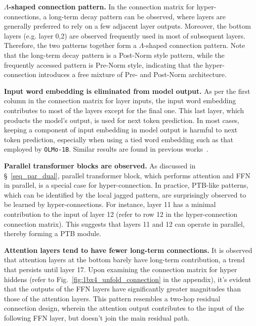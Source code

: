 \textbf{$\Lambda$-shaped connection pattern. } In the connection matrix for hyper-connections, a long-term decay pattern can be observed, where layers are generally preferred to rely on a few adjacent layer outputs. Moreover, the bottom layers (e.g. layer 0,2) are observed frequently used in most of subsequent layers. Therefore, the two patterns together form a $\Lambda$-shaped connection pattern. Note that the long-term decay pattern is a Post-Norm style pattern, while the frequently accessed pattern is Pre-Norm style, indicating that the hyper-connection introduces a free mixture of Pre- and Post-Norm architecture.

\textbf{Input word embedding is eliminated from model output.} As per the first column in the connection matrix for layer inputs, the input word embedding contributes to most of the layers except for the final one. This last layer, which products the model's output, is used for next token prediction. In most cases, keeping a component of input embedding in model output is harmful to next token prediction, especially when using a tied word embedding such as that employed by \texttt{OLMo-1B}. Similar results are found in previous works~\citep{ma2023denseformer}. %

\textbf{Parallel transformer blocks are observed.} As discussed in \S~\ref{seq_par_dual}, parallel transformer block, which performs attention and FFN in parallel, is a special case for hyper-connection. In practice, PTB-like patterns, which can be identified by the local jagged pattern, are surprisingly observed to be learned by hyper-connections. For instance, layer 11 has a minimal contribution to the input of layer 12 (refer to row 12 in the hyper-connection connection matrix). This suggests that layers 11 and 12 can operate in parallel, thereby forming a PTB module.

\textbf{Attention layers tend to have fewer long-term connections.} It is observed that attention layers at the bottom barely have long-term contribution, a trend that persists until layer 17. Upon examining the connection matrix for hyper hiddens (refer to Fig.~\ref{fig:1bx4_unfold_connection} in the appendix), it's evident that the outputs of the FFN layers have significantly greater magnitudes than those of the attention layers. This pattern resembles a two-hop residual connection design, wherein the attention output contributes to the input of the following FFN layer, but doesn't join the main residual path.